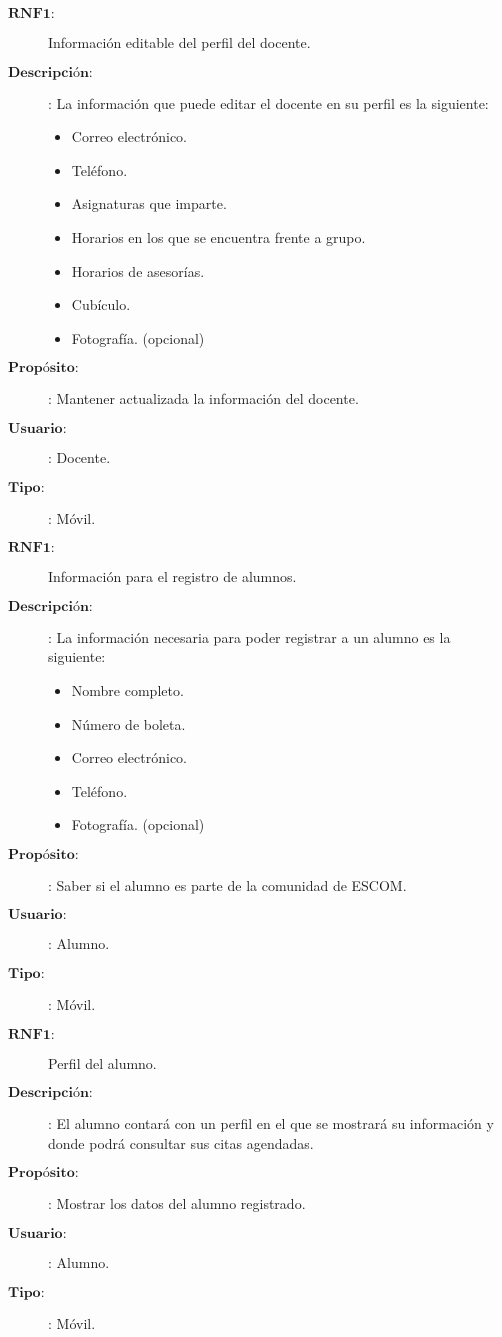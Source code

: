 \begin{description}
\item[$\textbf{RNF1:}$] Información editable del perfil del docente.
\item[$\textbf{Descripción:}$]: La información que puede editar el docente en su perfil es la siguiente:
	\begin{itemize}
		\item Correo electrónico.
		\item Teléfono.
		\item Asignaturas que imparte.
		\item Horarios en los que se encuentra frente a grupo.
		\item Horarios de asesorías.
		\item Cubículo.
		\item Fotografía. (opcional)
	\end{itemize}
\item[$\textbf{Propósito:}$]: Mantener actualizada la información del docente.
\item[$\textbf{Usuario:}$]: Docente.
\item[$\textbf{Tipo:}$]: Móvil. \\

\item[$\textbf{RNF1:}$] Información para el registro de alumnos.
\item[$\textbf{Descripción:}$]: La información necesaria para poder registrar a un alumno es la siguiente:
	\begin{itemize}
		\item Nombre completo.
		\item Número de boleta.
		\item Correo electrónico.
		\item Teléfono.
		\item Fotografía. (opcional)
	\end{itemize}
\item[$\textbf{Propósito:}$]: Saber si el alumno es parte de la comunidad de ESCOM.
\item[$\textbf{Usuario:}$]: Alumno.
\item[$\textbf{Tipo:}$]: Móvil.  \\

\item[$\textbf{RNF1:}$] Perfil del alumno.
\item[$\textbf{Descripción:}$]: El alumno contará con un perfil en el que se mostrará su información y donde podrá consultar sus citas agendadas.
\item[$\textbf{Propósito:}$]: Mostrar los datos del alumno registrado.
\item[$\textbf{Usuario:}$]: Alumno.
\item[$\textbf{Tipo:}$]: Móvil. \\


\end{description}
